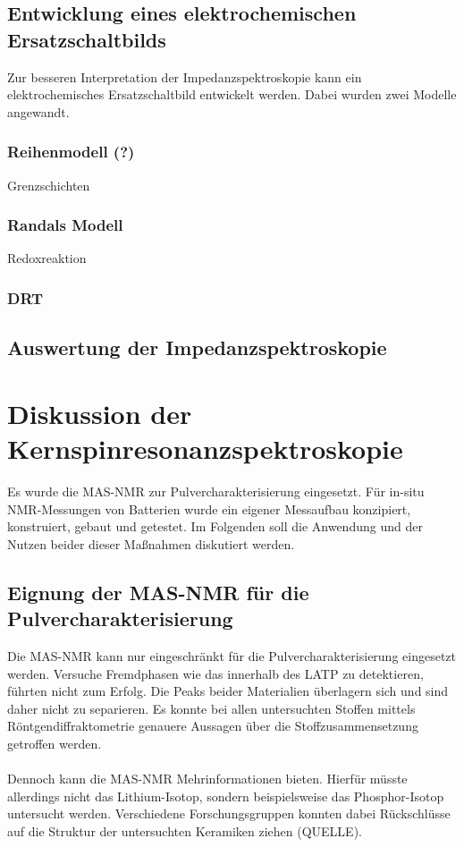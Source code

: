 \documentclass[a4paper, 11pt, headsepline,footsepline,twoside,abstract]{scrbook}
\begin{document}
\subsection{Entwicklung eines elektrochemischen Ersatzschaltbilds}
Zur besseren Interpretation der Impedanzspektroskopie kann ein elektrochemisches Ersatzschaltbild entwickelt werden. Dabei wurden zwei Modelle angewandt.
\subsubsection{Reihenmodell (?)}
Grenzschichten
\subsubsection{Randals Modell}
Redoxreaktion
\subsubsection{DRT}
\subsection{Auswertung der Impedanzspektroskopie}
\section{Diskussion der Kernspinresonanzspektroskopie}
Es wurde die MAS-NMR zur Pulvercharakterisierung eingesetzt. Für in-situ NMR-Messungen von Batterien wurde ein eigener Messaufbau konzipiert, konstruiert, gebaut und getestet. Im Folgenden soll die Anwendung und der Nutzen beider dieser Maßnahmen diskutiert werden. 
\subsection{Eignung der MAS-NMR für die Pulvercharakterisierung}
Die MAS-NMR kann nur eingeschränkt für die Pulvercharakterisierung eingesetzt werden. Versuche Fremdphasen wie das  innerhalb des LATP zu detektieren, führten nicht zum Erfolg. Die Peaks beider Materialien überlagern sich und sind daher nicht zu separieren. Es konnte bei allen untersuchten Stoffen mittels Röntgendiffraktometrie genauere Aussagen über die Stoffzusammensetzung getroffen werden.
\\\\
Dennoch kann die MAS-NMR Mehrinformationen bieten. Hierfür müsste allerdings nicht das Lithium-Isotop, sondern beispielsweise das Phosphor-Isotop untersucht werden. Verschiedene Forschungsgruppen konnten dabei Rückschlüsse auf die Struktur der untersuchten Keramiken ziehen (QUELLE).
\end{document}
